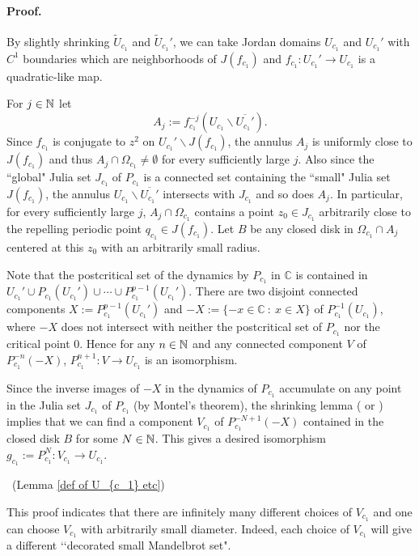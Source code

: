 \paragraph{\bf Proof.}
By slightly shrinking $\widetilde{U}_{c_1}$ and $\widetilde{U}_{c_1}'$,
we can take Jordan domains $U_{c_1}$ and $U_{c_1}'$ 
with $C^1$ boundaries which are neighborhoods of $J(f_{c_1})$ 
and $f_{c_1} : U_{c_1}' \to U_{c_1}$ is a quadratic-like map. 

For $j \in \mathbb N$ let
$$
  A_j := f_{c_1}^{-j}(U_{c_1} \smallsetminus \overline{U_{c_1}'}).
$$
Since $f_{c_1}$ is conjugate to $z^2$ on 
$U_{c_1}' \smallsetminus J(f_{c_1})$,
the annulus $A_j$ is uniformly close to $J(f_{c_1})$ and  
thus $A_j \cap \Omega_{c_1} \ne \emptyset$ for every sufficiently large $j$.
Also since the ``global" Julia set $J_{c_1}$ of $P_{c_1}$ is a connected set containing the ``small" Julia set $J(f_{c_1})$, 
the annulus $U_{c_1} \smallsetminus \overline{U_{c_1}'}$
intersects with $J_{c_1}$ 
and so does $A_j$.
In particular, for every sufficiently large $j$, 
$A_j \cap \Omega_{c_1}$ contains 
a point $z_0 \in J_{c_1}$ 
arbitrarily close to the repelling periodic point 
$q_{c_1} \in J(f_{c_1})$.
Let $B$ be any closed disk in $\Omega_{c_1} \cap A_j$ 
centered at this $z_0$ with an arbitrarily small radius. 

Note that the postcritical set of 
the dynamics by $P_{c_1}$ in $\mathbb C$ 
is contained in 
$U_{c_1}' \cup P_{c_1}(U_{c_1}') \cup \cdots \cup P_{c_1}^{p-1}(U_{c_1}')$.
There are two disjoint connected components 
$X:=P_{c_1}^{p-1}(U_{c_1}')$
and 
$-X:=\{-x \in \mathbb{C} ~:~ x \in X\}$
of $P_{c_1}^{-1}(U_{c_1})$, 
where $-X$ does not intersect with neither 
the postcritical set of $P_{c_1}$ nor the critical point $0$.
Hence for any $n \in \mathbb N$ and any connected component $V$ of
$P_{c_1}^{-n}(-X)$,
$P_{c_1}^{n+1}:V \to U_{c_1}$ is an isomorphism.

Since the inverse images of $-X$ in the dynamics of $P_{c_1}$
accumulate on any point in the Julia set $J_{c_1}$ of $P_{c_1}$ 
(by Montel's theorem), 
the shrinking lemma (\cite[p.86]{Lyubich-Minsky 1997} or 
\cite[Lem.2.9]{Cui-Tan 2018})
implies that we can find a component $V_{c_1}$ of 
$P_{c_1}^{-N+1}(-X)$ contained in the closed disk $B$ 
for some $N \in \mathbb N$. 
This gives a desired isomorphism $g_{c_1}:=P_{c_1}^N:V_{c_1} \to U_{c_1}$.

\hfill
\QED ~{\small (Lemma \ref{def of U_{c_1} etc})}
\\


\begin{rem*}
This proof indicates that there are infinitely many different choices of $V_{c_1}$ and one can choose $V_{c_1}$ with arbitrarily small diameter. 
Indeed, each choice of $V_{c_1}$ will give a different \lq\lq decorated small Mandelbrot set".
\end{rem*}


